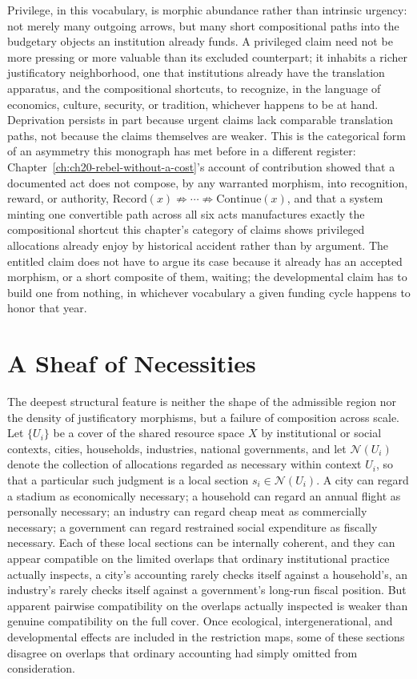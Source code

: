 Privilege, in this vocabulary, is morphic abundance rather than intrinsic urgency: not merely many outgoing arrows, but many short compositional paths into the budgetary objects an institution already funds. A privileged claim need not be more pressing or more valuable than its excluded counterpart; it inhabits a richer justificatory neighborhood, one that institutions already have the translation apparatus, and the compositional shortcuts, to recognize, in the language of economics, culture, security, or tradition, whichever happens to be at hand. Deprivation persists in part because urgent claims lack comparable translation paths, not because the claims themselves are weaker. This is the categorical form of an asymmetry this monograph has met before in a different register: Chapter~\ref{ch:ch20-rebel-without-a-cost}'s account of contribution showed that a documented act does not compose, by any warranted morphism, into recognition, reward, or authority, $\mathrm{Record}(x) \not\Rightarrow \cdots \not\Rightarrow \mathrm{Continue}(x)$, and that a system minting one convertible path across all six acts manufactures exactly the compositional shortcut this chapter's category of claims shows privileged allocations already enjoy by historical accident rather than by argument. The entitled claim does not have to argue its case because it already has an accepted morphism, or a short composite of them, waiting; the developmental claim has to build one from nothing, in whichever vocabulary a given funding cycle happens to honor that year.

\section{A Sheaf of Necessities}

The deepest structural feature is neither the shape of the admissible region nor the density of justificatory morphisms, but a failure of composition across scale. Let $\{U_i\}$ be a cover of the shared resource space $X$ by institutional or social contexts, cities, households, industries, national governments, and let $\mathcal{N}(U_i)$ denote the collection of allocations regarded as necessary within context $U_i$, so that a particular such judgment is a local section $s_i \in \mathcal{N}(U_i)$. A city can regard a stadium as economically necessary; a household can regard an annual flight as personally necessary; an industry can regard cheap meat as commercially necessary; a government can regard restrained social expenditure as fiscally necessary. Each of these local sections can be internally coherent, and they can appear compatible on the limited overlaps that ordinary institutional practice actually inspects, a city's accounting rarely checks itself against a household's, an industry's rarely checks itself against a government's long-run fiscal position. But apparent pairwise compatibility on the overlaps actually inspected is weaker than genuine compatibility on the full cover. Once ecological, intergenerational, and developmental effects are included in the restriction maps, some of these sections disagree on overlaps that ordinary accounting had simply omitted from consideration.

